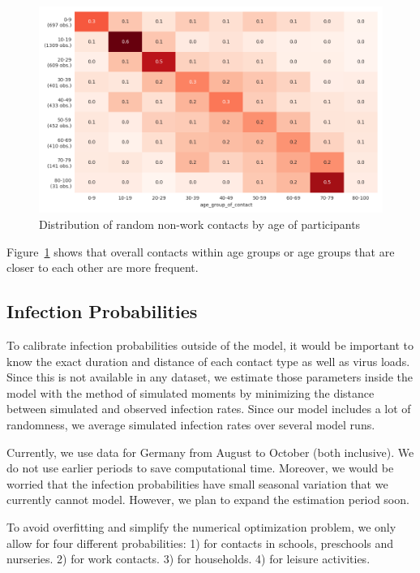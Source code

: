 
\begin{figure}[!tp]
    \centering
    \includegraphics[width=\textwidth]{../figures/assortative_matching_probability_example.png}
    \caption{Distribution of random non-work contacts by age of participants}
    \label{fig:assortativeness}
\end{figure}

Figure~\ref{fig:assortativeness} shows that overall contacts within age groups or age groups that are closer to each other are more frequent.


\subsection{Infection Probabilities}
\label{sec:estimation}

To calibrate infection probabilities outside of the model, it would be important to know the exact duration and distance of each contact type as well as virus loads. Since this is not available in any dataset, we estimate those parameters inside the model with the method of simulated moments \citep{McFadden1989} by minimizing the distance between simulated and observed infection rates. Since our model includes a lot of randomness, we average simulated infection rates over several model runs.

Currently, we use data for Germany from August to October (both inclusive). We do not use earlier periods to save computational time. Moreover, we would be worried that the infection probabilities have small seasonal variation that we currently cannot model. However, we plan to expand the estimation period soon.

To avoid overfitting and simplify the numerical optimization problem, we only allow for four different probabilities: 1) for contacts in schools, preschools and nurseries. 2) for work contacts. 3) for households. 4) for leisure activities.
